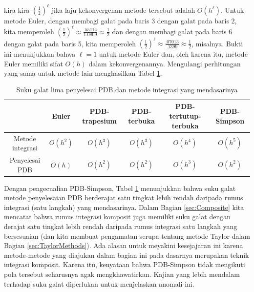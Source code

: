 kira-kira $\left(\frac{1}{2}\right)^{\ell}$ jika laju kekonvergenan
metode tersebut adalah $O(h^{\ell})$. Untuk metode Euler, dengan
membagi galat pada baris 3 dengan galat pada baris 2, kita memperoleh
$\left(\frac{1}{2}\right)^{\ell}\approx\frac{.55114}{1.0809}\approx\frac{1}{2}$
dan dengan membagi galat pada baris 6 dengan galat pada baris 5, kita
memperoleh $\left(\frac{1}{2}\right)^{\ell}\approx\frac{.07013}{.1399}\approx\frac{1}{2}$,
misalnya. Bukti ini menunjukkan bahwa $\ell=1$ untuk metode Euler
dan, oleh karena itu, metode Euler memiliki sifat $O(h)$ dalam kekonvergenannya.
Mengulangi perhitungan yang sama untuk metode lain menghasilkan Tabel
\ref{tab:odeMethodOrders}.
\begin{table}
\caption{\label{tab:odeMethodOrders}Suku galat lima penyelesai PDB dan metode
integrasi yang mendasarinya}

\begin{centering}
\begin{tabular}{cccccc}
 & Euler & PDB-trapesium & PDB-terbuka & PDB-tertutup-terbuka & PDB-Simpson\tabularnewline
\hline 
Metode integrasi & $O(h^{2})$ & $O(h^{3})$ & $O(h^{3})$ & $O(h^{4})$ & $O(h^{5})$\tabularnewline
Penyelesai PDB & $O(h)$ & $O(h^{2})$ & $O(h^{2})$ & $O(h^{3})$ & $O(h^{2})$\tabularnewline
\end{tabular}
\par\end{centering}
\end{table}

Dengan pengecualian PDB-Simpson, Tabel \ref{tab:odeMethodOrders}
menunjukkan bahwa suku galat metode penyelesaian PDB berderajat satu
tingkat lebih rendah daripada rumus integrasi (satu langkah) yang
mendasarinya. Dalam Bagian \ref{sec:Composite} kita mencatat bahwa
rumus integrasi komposit juga memiliki suku galat dengan derajat satu
tingkat lebih rendah daripada rumus integrasi satu langkah yang bersesuaian
(dan kita membuat pengamatan serupa tentang metode Taylor dalam Bagian
\ref{sec:TaylorMethods}). Ada alasan untuk meyakini kesejajaran ini
karena metode-metode yang diajukan dalam bagian ini pada dasarnya
merupakan teknik integrasi komposit. Karena itu, kenyataan bahwa PDB-Simpson
tidak mengikuti pola tersebut seharusnya agak mengkhawatirkan. Kajian
yang lebih mendalam terhadap suku galat diperlukan untuk menjelaskan
anomali ini.

